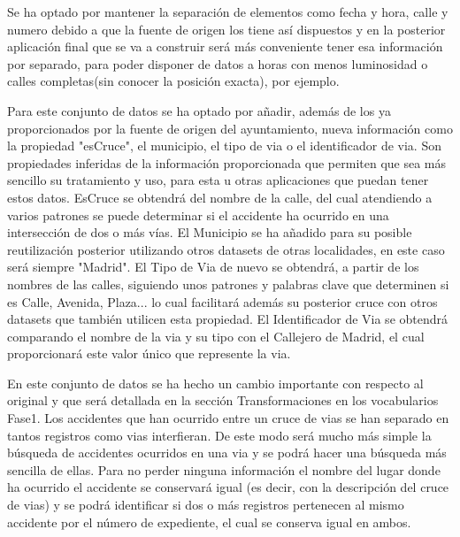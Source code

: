 Se ha optado por mantener la separación de elementos como fecha y hora, calle y numero debido a que la fuente de origen los tiene así dispuestos y en la posterior aplicación final que se va a construir será más conveniente tener esa información por separado, para poder disponer de datos a horas con menos luminosidad o calles completas(sin conocer la posición exacta), por ejemplo.


Para este conjunto de datos se ha optado por añadir, además de los ya proporcionados por la fuente de origen del ayuntamiento, nueva información como la propiedad "esCruce", el municipio, el tipo de via o el identificador de via. Son propiedades inferidas de la información proporcionada que permiten que sea más sencillo su tratamiento y uso, para esta u otras aplicaciones que puedan tener estos datos.
EsCruce se obtendrá del nombre de la calle, del cual atendiendo a varios patrones se puede determinar si el accidente ha ocurrido en una intersección de dos o más vías.
El Municipio se ha añadido para su posible reutilización posterior utilizando otros datasets de otras localidades, en este caso será siempre "Madrid".
El Tipo de Via de nuevo se obtendrá, a partir de los nombres de las calles, siguiendo unos patrones y palabras clave que determinen si es Calle, Avenida, Plaza... lo cual facilitará además su posterior cruce con otros datasets que también utilicen esta propiedad.
El Identificador de Via se obtendrá comparando el nombre de la via y su tipo con el Callejero de Madrid, el cual proporcionará este valor único que represente la via.

En este conjunto de datos se ha hecho un cambio importante con respecto al original y que será detallada en la sección Transformaciones en los vocabularios Fase1. Los accidentes que han ocurrido entre un cruce de vias se han separado en tantos registros como vias interfieran. De este modo será mucho más simple la búsqueda de accidentes ocurridos en una via y se podrá hacer una búsqueda más sencilla de ellas. Para no perder ninguna información el nombre del lugar donde ha ocurrido el accidente se conservará igual (es decir, con la descripción del cruce de vias) y se podrá identificar si dos o más registros pertenecen al mismo accidente por el número de expediente, el cual se conserva igual en ambos.



